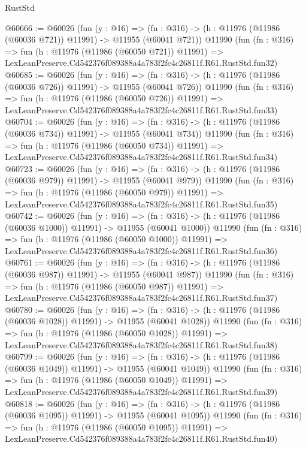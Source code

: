 \begin{lexlean}{RustStd}
\begin{coremodule}
@60666 := @60026
    (fun (y : @16) =>
    (fn : @316) -> (h : @11976 (@11986 (@60036 @721)) @11991) -> @11955 (@60041 @721))
    @11990
    (fun (fn : @316) =>
    fun (h : @11976 (@11986 (@60050 @721)) @11991) =>
    LexLeanPreserve.Cd542376f089388a4a783f2fc4c26811f.R61.RustStd.fun32)
@60685 := @60026
    (fun (y : @16) =>
    (fn : @316) -> (h : @11976 (@11986 (@60036 @726)) @11991) -> @11955 (@60041 @726))
    @11990
    (fun (fn : @316) =>
    fun (h : @11976 (@11986 (@60050 @726)) @11991) =>
    LexLeanPreserve.Cd542376f089388a4a783f2fc4c26811f.R61.RustStd.fun33)
@60704 := @60026
    (fun (y : @16) =>
    (fn : @316) -> (h : @11976 (@11986 (@60036 @734)) @11991) -> @11955 (@60041 @734))
    @11990
    (fun (fn : @316) =>
    fun (h : @11976 (@11986 (@60050 @734)) @11991) =>
    LexLeanPreserve.Cd542376f089388a4a783f2fc4c26811f.R61.RustStd.fun34)
@60723 := @60026
    (fun (y : @16) =>
    (fn : @316) -> (h : @11976 (@11986 (@60036 @979)) @11991) -> @11955 (@60041 @979))
    @11990
    (fun (fn : @316) =>
    fun (h : @11976 (@11986 (@60050 @979)) @11991) =>
    LexLeanPreserve.Cd542376f089388a4a783f2fc4c26811f.R61.RustStd.fun35)
@60742 := @60026
    (fun (y : @16) =>
    (fn : @316) -> (h : @11976 (@11986 (@60036 @1000)) @11991) -> @11955 (@60041 @1000))
    @11990
    (fun (fn : @316) =>
    fun (h : @11976 (@11986 (@60050 @1000)) @11991) =>
    LexLeanPreserve.Cd542376f089388a4a783f2fc4c26811f.R61.RustStd.fun36)
@60761 := @60026
    (fun (y : @16) =>
    (fn : @316) -> (h : @11976 (@11986 (@60036 @987)) @11991) -> @11955 (@60041 @987))
    @11990
    (fun (fn : @316) =>
    fun (h : @11976 (@11986 (@60050 @987)) @11991) =>
    LexLeanPreserve.Cd542376f089388a4a783f2fc4c26811f.R61.RustStd.fun37)
@60780 := @60026
    (fun (y : @16) =>
    (fn : @316) -> (h : @11976 (@11986 (@60036 @1028)) @11991) -> @11955 (@60041 @1028))
    @11990
    (fun (fn : @316) =>
    fun (h : @11976 (@11986 (@60050 @1028)) @11991) =>
    LexLeanPreserve.Cd542376f089388a4a783f2fc4c26811f.R61.RustStd.fun38)
@60799 := @60026
    (fun (y : @16) =>
    (fn : @316) -> (h : @11976 (@11986 (@60036 @1049)) @11991) -> @11955 (@60041 @1049))
    @11990
    (fun (fn : @316) =>
    fun (h : @11976 (@11986 (@60050 @1049)) @11991) =>
    LexLeanPreserve.Cd542376f089388a4a783f2fc4c26811f.R61.RustStd.fun39)
@60818 := @60026
    (fun (y : @16) =>
    (fn : @316) -> (h : @11976 (@11986 (@60036 @1095)) @11991) -> @11955 (@60041 @1095))
    @11990
    (fun (fn : @316) =>
    fun (h : @11976 (@11986 (@60050 @1095)) @11991) =>
    LexLeanPreserve.Cd542376f089388a4a783f2fc4c26811f.R61.RustStd.fun40)

\end{coremodule}
\end{lexlean}
